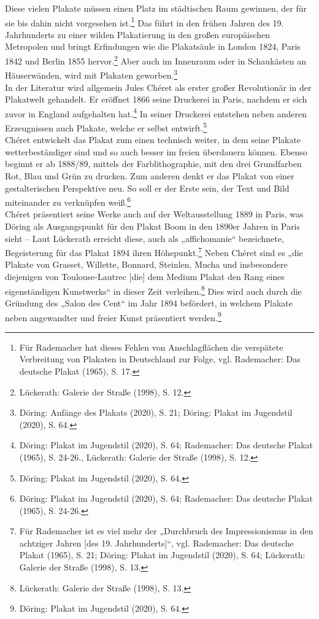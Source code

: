 \documentclass[a4paper,12pt,ngerman]{article}
\begin{document}
Diese vielen Plakate müssen einen Platz im städtischen Raum gewinnen, der für sie bis dahin nicht vorgesehen ist.\footnote{Für Rademacher hat dieses Fehlen von Anschlagflächen die verspätete Verbreitung von Plakaten in Deutschland zur Folge, vgl. Rademacher: Das deutsche Plakat (1965), S. 17.}  Das führt in den frühen Jahren des 19. Jahrhunderts zu einer wilden Plakatierung in den großen europäischen Metropolen und bringt Erfindungen wie die Plakatsäule in London 1824, Paris 1842 und Berlin 1855 hervor.\footnote{Lückerath: Galerie der Straße (1998), S. 12.}  Aber auch im Innenraum oder in Schaukästen an Häuserwänden, wird mit Plakaten geworben.\footnote{Döring: Anfänge des Plakats (2020), S. 21; Döring: Plakat im Jugendstil (2020), S. 64.} \\
In der Literatur wird allgemein Jules Chéret als erster großer Revolutionär in der Plakatwelt gehandelt. Er eröffnet 1866 seine Druckerei in Paris, nachdem er sich zuvor in England aufgehalten hat.\footnote{Döring: Plakat im Jugendstil (2020), S. 64; Rademacher: Das deutsche Plakat (1965), S. 24-26., Lückerath: Galerie der Straße (1998), S. 12.}  In seiner Druckerei entstehen neben anderen Erzeugnissen auch Plakate, welche er selbst entwirft.\footnote{Döring: Plakat im Jugendstil (2020), S. 64.} \\
Chéret entwickelt das Plakat zum einen technisch weiter, in dem seine Plakate wetterbeständiger sind und so auch besser im freien überdauern können. Ebenso beginnt er ab 1888/89, mittels der Farblithographie, mit den drei Grundfarben Rot, Blau und Grün zu drucken. Zum anderen denkt er das Plakat von einer gestalterischen Perspektive neu. So soll er der Erste sein, der Text und Bild miteinander zu verknüpfen weiß.\footnote{Döring: Plakat im Jugendstil (2020), S. 64; Rademacher: Das deutsche Plakat (1965), S. 24-26.} \\
Chéret präsentiert seine Werke auch auf der Weltausstellung 1889 in Paris, was Döring als Ausgangspunkt für den Plakat Boom in den 1890er Jahren in Paris sieht -- Laut Lückerath erreicht diese, auch als „affichomanie“ bezeichnete, Begeisterung für das Plakat 1894 ihren Höhepunkt.\footnote{Für Rademacher ist es viel mehr der „Durchbruch des Impressionismus in den achtziger Jahren [des 19. Jahrhunderts]“, vgl. Rademacher: Das deutsche Plakat (1965), S. 21; Döring: Plakat im Jugendstil (2020), S. 64; Lückerath: Galerie der Straße (1998), S. 13.}  Neben Chéret sind es „die Plakate von Grasset, Willette, Bonnard, Steinlen, Mucha und insbesondere diejenigen von Toulouse-Lautrec [die] dem Medium Plakat den Rang eines eigenständigen Kunstwerks“ in dieser Zeit verleihen.\footnote{Lückerath: Galerie der Straße (1998), S. 13.}  Dies wird auch durch die Gründung des „Salon des Cent“ im Jahr 1894 befördert, in welchem Plakate neben angewandter und freier Kunst präsentiert werden.\footnote{Döring: Plakat im Jugendstil (2020), S. 64.} \\
\end{document}

